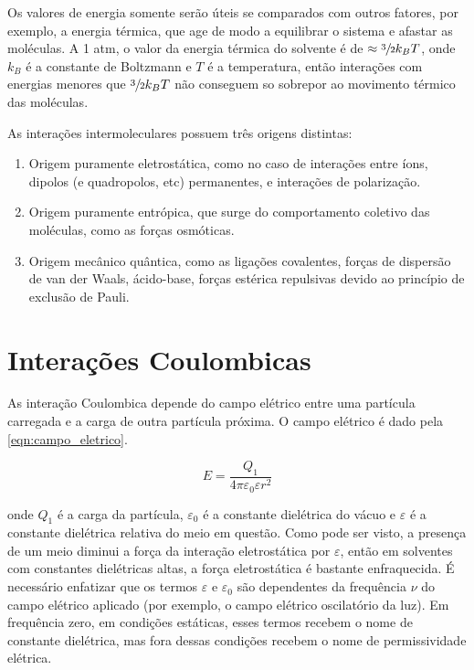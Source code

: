 	Os valores de energia somente serão úteis se comparados com outros fatores, por exemplo, a energia térmica, que age de modo a equilibrar o sistema e afastar as moléculas. A 1 atm, o valor da energia térmica do solvente é de \(\approx \sfrac{3}{2} k_B T\), onde \(k_B\) é a constante de Boltzmann e \(T\) é a temperatura, então interações com energias menores que \(\sfrac{3}{2}k_BT\) não conseguem so sobrepor ao movimento térmico das moléculas. 
	
	As interações intermoleculares possuem três origens distintas:
	
	\begin{enumerate}[noitemsep] 
		\item Origem puramente eletrostática, como no caso de interações entre íons, dipolos (e quadropolos, etc) permanentes, e interações de polarização.
		\item Origem puramente entrópica, que surge do comportamento coletivo das moléculas, como as forças osmóticas.
		\item Origem mecânico quântica, como as ligações covalentes, forças de dispersão de van der Waals, ácido-base, forças estérica repulsivas devido ao princípio de exclusão de Pauli.
	\end{enumerate} 
	
	\section{Interações Coulombicas} 
	
	As interação Coulombica depende do campo elétrico entre uma partícula carregada e a carga de outra partícula próxima. O campo elétrico é dado pela \autoref{eqn:campo_eletrico}.
	
	\begin{equation}
		E = \dfrac{Q_1}{4\pi\varepsilon_0\varepsilon r^2}
		\label{eqn:campo_eletrico}
	\end{equation} 

	\noindent onde \(Q_1\) é a carga da partícula, \(\varepsilon_0\) é a constante dielétrica do vácuo e \(\varepsilon\) é a constante dielétrica relativa do meio em questão.  Como pode ser visto, a presença de um meio diminui a força da interação eletrostática por \(\varepsilon\), então em solventes com constantes dielétricas altas, a força eletrostática é bastante enfraquecida. É necessário enfatizar que os termos \(\varepsilon\) e \(\varepsilon_0\) são dependentes da frequência \(\nu\) do campo elétrico aplicado (por exemplo, o campo elétrico oscilatório da luz). Em frequência zero, em condições estáticas, esses termos recebem o nome de constante dielétrica, mas fora dessas condições recebem o nome de permissividade elétrica. 
	
